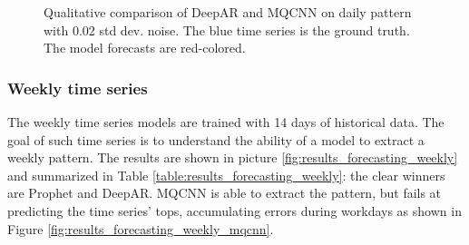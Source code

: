 \documentclass[a4paper, 12pt]{article} %
\begin{document}
	\begin{figure}\centering
		 \hfill
		
		\caption{Qualitative comparison of DeepAR and MQCNN on daily pattern with 0.02 std dev. noise. The blue time series is the ground truth. The model forecasts are red-colored.}
		\label{fig:results_forecasting_daily_02_mqcnn_deepar}
	\end{figure}
	
	\clearpage
	\subsubsection{Weekly time series} \label{sssec:results_forecasting_weekly}
	The weekly time series models are trained with 14 days of historical data. The goal of such time series is to understand the ability of a model to extract a weekly pattern.
	 The results are shown in picture \ref{fig:results_forecasting_weekly} and summarized in Table \ref{table:results_forecasting_weekly}: the clear winners are Prophet and DeepAR. MQCNN is able to extract the pattern, but fails at predicting the time series' tops, accumulating errors during workdays as shown in Figure \ref{fig:results_forecasting_weekly_mqcnn}.
	
\end{document}
